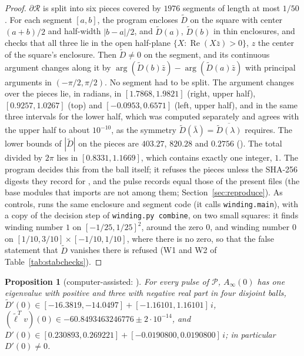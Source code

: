 \documentclass[11pt]{article}
\newtheorem{proposition}[lemma]{Proposition}
\theoremstyle{definition}
\newcommand{\re}{\operatorname{Re}}
\newcommand{\Rbox}{\mathcal{R}}
\newcommand{\Pcl}{\mathcal{P}}
\begin{document}
\begin{proof}
$\partial\Rbox$ is split into six pieces covered by $1976$ segments of length at most $1/50$. For each segment $[a, b]$, the program encloses $\tilde D$ on the square with center $(a + b)/2$ and half-width $|b - a|/2$, and $\tilde D(a)$, $\tilde D(b)$ in thin enclosures, and checks that all three lie in the open half-plane $\{X : \re(X\bar z) > 0\}$, $z$ the center of the square's enclosure. Then $\tilde D \ne 0$ on the segment, and its continuous argument changes along it by $\arg(\tilde D(b)\bar z) - \arg(\tilde D(a)\bar z)$ with principal arguments in $(-\pi/2, \pi/2)$. No segment had to be split. The argument changes over the pieces lie, in radians, in $[1.7868, 1.9821]$ (right, upper half), $[0.9257, 1.0267]$ (top) and $[-0.0953, 0.6571]$ (left, upper half), and in the same three intervals for the lower half, which was computed separately and agrees with the upper half to about $10^{-10}$, as the symmetry $\tilde D(\bar\lambda) = \overline{\tilde D(\lambda)}$ requires. The lower bounds of $|\tilde D|$ on the pieces are $403.27$, $820.28$ and $0.2756$ (). The total divided by $2\pi$ lies in $[0.8331, 1.1669]$, which contains exactly one integer, $1$. The program  decides this from the ball itself; it refuses the pieces unless the SHA-256 digests they record for ,  and the pulse records equal those of the present files (the base modules that  imports are not among them; Section~\ref{sec:reproduce}). As controls,  runs the same enclosure and segment code (it calls \texttt{winding.main}), with a copy of the decision step of \texttt{winding.py combine}, on two small squares: it finds winding number $1$ on $[-1/25, 1/25]^2$, around the zero $0$, and winding number $0$ on $[1/10, 3/10] \times [-1/10, 1/10]$, where there is no zero, so that the false statement that $\tilde D$ vanishes there is refused (W1 and W2 of Table~\ref{tab:stabchecks}).
\end{proof}

\begin{proposition}[computer-assisted: ]\label{prop:simplezero}
For every pulse of $\Pcl$, $A_\infty(0)$ has one eigenvalue with positive and three with negative real part in four disjoint balls, $\tilde D'(0) \in [-16.3819, -14.0497] + [-1.16101, 1.16101]\,i$, $(\tilde\ell^Tv)(0) \in -60.8493463246776 \pm 2\cdot 10^{-14}$, and $D'(0) \in [0.230893, 0.269221] + [-0.0190800, 0.0190800]\,i$; in particular $D'(0) \ne 0$.
\end{proposition}
\end{document}

